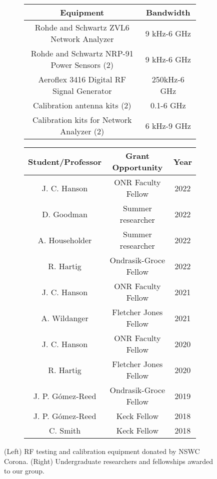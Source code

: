 \documentclass[../../main.tex]{subfiles}
\begin{document}
\begin{figure}[hb]
\footnotesize
\centering
\begin{subfigure}{0.45\textwidth}
\centering
\begin{tabular}{c c}
Equipment & Bandwidth \\ \hline
Rohde and Schwartz ZVL6 Network Analyzer & 9 kHz-6 GHz \\
Rohde and Schwartz NRP-91 Power Sensors (2) & 9 kHz-6 GHz \\
Aeroflex 3416 Digital RF Signal Generator & 250kHz-6 GHz \\
Calibration antenna kits (2) & 0.1-6 GHz \\
Calibration kits for Network Analyzer (2) & 6 kHz-9 GHz
\end{tabular}
\end{subfigure}
\hfill
\begin{subfigure}{0.45\textwidth}
\centering
\begin{tabular}{c c c}
Student/Professor & Grant Opportunity & Year \\ \hline
J. C. Hanson & ONR Faculty Fellow & 2022 \\
D. Goodman & Summer researcher & 2022 \\
A. Householder & Summer researcher & 2022 \\
R. Hartig & Ondrasik-Groce Fellow & 2022 \\
J. C. Hanson & ONR Faculty Fellow & 2021 \\
A. Wildanger & Fletcher Jones Fellow & 2021 \\
J. C. Hanson & ONR Faculty Fellow & 2020 \\
R. Hartig & Fletcher Jones Fellow & 2020 \\
J. P. G\'{o}mez-Reed & Ondrasik-Groce Fellow & 2019 \\
J. P. G\'{o}mez-Reed & Keck Fellow & 2018 \\
C. Smith & Keck Fellow & 2018
\end{tabular}
\end{subfigure}
\caption{\label{tab:fac} (Left) RF testing and calibration equipment donated by NSWC Corona. (Right) Undergraduate researchers and fellowships awarded to our group.}
\end{figure}
\end{document}
